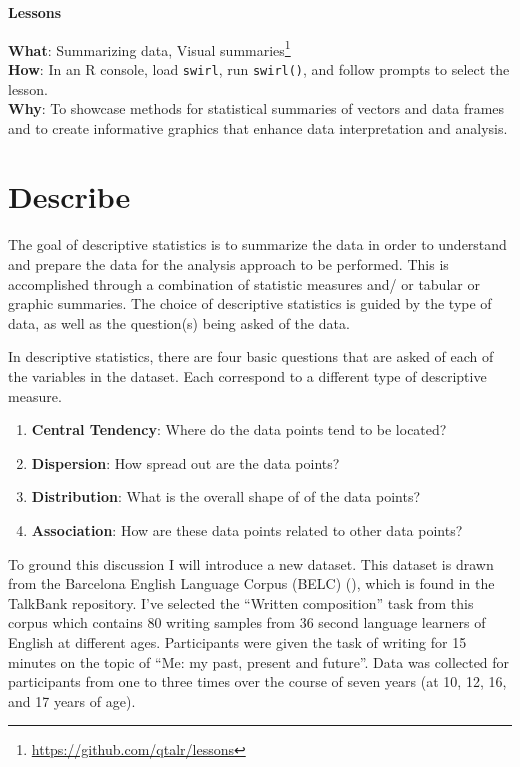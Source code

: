 \documentclass[
  letterpaper,
]{latex/krantz}
\providecommand{\tightlist}{%
  \setlength{\itemsep}{0pt}\setlength{\parskip}{0pt}}\usepackage{longtable,booktabs,array}
\theoremstyle{definition}
\theoremstyle{remark}
\DeclareRobustCommand{\href}[2]{#2\footnote{\url{#1}}}
\begin{document}
\begin{tcolorbox}[enhanced jigsaw, toprule=.15mm, breakable, colback=white, opacityback=0, leftrule=.75mm, bottomrule=.15mm, colframe=quarto-callout-color-frame, left=2mm, arc=.35mm, rightrule=.15mm]

\textbf{ Lessons}

\textbf{What}: \href{https://github.com/qtalr/lessons}{Summarizing data,
Visual summaries}\\
\textbf{How}: In an R console, load \texttt{swirl}, run
\texttt{swirl()}, and follow prompts to select the lesson.\\
\textbf{Why}: To showcase methods for statistical summaries of vectors
and data frames and to create informative graphics that enhance data
interpretation and analysis.

\end{tcolorbox}

\section{Describe}\label{sec-aa-describe}

The goal of descriptive statistics is to summarize the data in order to
understand and prepare the data for the analysis approach to be
performed. This is accomplished through a combination of statistic
measures and/ or tabular or graphic summaries. The choice of descriptive
statistics is guided by the type of data, as well as the question(s)
being asked of the data.

In descriptive statistics, there are four basic questions that are asked
of each of the variables in the dataset. Each correspond to a different
type of descriptive measure.

\begin{enumerate}
\def\labelenumi{\arabic{enumi}.}
\tightlist
\item
  \textbf{Central Tendency}: Where do the data points tend to be
  located?
\item
  \textbf{Dispersion}: How spread out are the data points?
\item
  \textbf{Distribution}: What is the overall shape of of the data
  points?
\item
  \textbf{Association}: How are these data points related to other data
  points?
\end{enumerate}

To ground this discussion I will introduce a new dataset. This dataset
is drawn from the Barcelona English Language Corpus (BELC)
(), which is found in the TalkBank
repository. I've selected the ``Written composition'' task from this
corpus which contains 80 writing samples from 36 second language
learners of English at different ages. Participants were given the task
of writing for 15 minutes on the topic of ``Me: my past, present and
future''. Data was collected for participants from one to three times
over the course of seven years (at 10, 12, 16, and 17 years of age).
\end{document}
